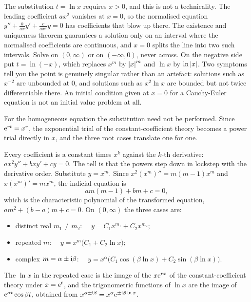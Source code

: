 \begin{keynote}
The substitution $t=\ln x$ requires $x>0$, and this is not a technicality. The leading coefficient $ax^{2}$ vanishes at $x=0$, so the normalised equation $y''+\tfrac{b}{ax}y'+\tfrac{c}{ax^{2}}y=0$ has coefficients that blow up there. The existence and uniqueness theorem guarantees a solution only on an interval where the normalised coefficients are continuous, and $x=0$ splits the line into two such intervals. Solve on $(0,\infty)$ or on $(-\infty,0)$, never across. On the negative side put $t=\ln(-x)$, which replaces $x^{m}$ by $\left\lvert x\right\rvert^{m}$ and $\ln x$ by $\ln\left\lvert x\right\rvert$. Two symptoms tell you the point is genuinely singular rather than an artefact: solutions such as $x^{-2}$ are unbounded at $0$, and solutions such as $x^{2}\ln x$ are bounded but not twice differentiable there. An initial condition given at $x=0$ for a Cauchy-Euler equation is not an initial value problem at all.
\end{keynote}

For the homogeneous equation the substitution need not be performed. Since $\mathrm{e}^{rt}=x^{r}$, the exponential trial of the constant-coefficient theory becomes a power trial directly in $x$, and the three root cases translate one for one.

\cue Every coefficient is a constant times $x^{k}$ against the $k$-th derivative: $ax^{2}y''+bxy'+cy=0$. The tell is that the powers step down in lockstep with the derivative order.
\method Substitute $y=x^{m}$. Since $x^{2}(x^{m})''=m(m-1)x^{m}$ and $x(x^{m})'=mx^{m}$, the indicial equation is
\[am(m-1)+bm+c=0,\]
which is the characteristic polynomial of the transformed equation, $am^{2}+(b-a)m+c=0$. On $(0,\infty)$ the three cases are:
\begin{itemize}
\item distinct real $m_1\ne m_2$: $\quad y=C_1x^{m_1}+C_2x^{m_2}$;
\item repeated $m$: $\quad y=x^{m}\bigl(C_1+C_2\ln x\bigr)$;
\item complex $m=\alpha\pm\mathrm{i}\beta$: $\quad y=x^{\alpha}\bigl(C_1\cos(\beta\ln x)+C_2\sin(\beta\ln x)\bigr)$.
\end{itemize}
The $\ln x$ in the repeated case is the image of the $x\mathrm{e}^{rx}$ of the constant-coefficient theory under $x=\mathrm{e}^{t}$, and the trigonometric functions of $\ln x$ are the image of $\mathrm{e}^{\alpha t}\cos\beta t$, obtained from $x^{\alpha\pm\mathrm{i}\beta}=x^{\alpha}\mathrm{e}^{\pm\mathrm{i}\beta\ln x}$.

